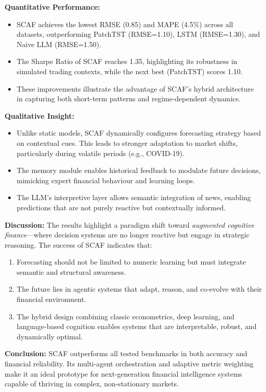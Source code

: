 \documentclass[conference]{IEEEtran}
\begin{document}
\textbf{Quantitative Performance:}
\begin{itemize}
    \item SCAF achieves the lowest RMSE (0.85) and MAPE (4.5\%) across all datasets, outperforming PatchTST (RMSE=1.10), LSTM (RMSE=1.30), and Naive LLM (RMSE=1.50).
    \item The Sharpe Ratio of SCAF reaches 1.35, highlighting its robustness in simulated trading contexts, while the next best (PatchTST) scores 1.10.
    \item These improvements illustrate the advantage of SCAF's hybrid architecture in capturing both short-term patterns and regime-dependent dynamics.
\end{itemize}

\textbf{Qualitative Insight:}
\begin{itemize}
    \item Unlike static models, SCAF dynamically configures forecasting strategy based on contextual cues. This leads to stronger adaptation to market shifts, particularly during volatile periods (e.g., COVID-19).
    \item The memory module enables historical feedback to modulate future decisions, mimicking expert financial behaviour and learning loops.
    \item The LLM’s interpretive layer allows semantic integration of news, enabling predictions that are not purely reactive but contextually informed.
\end{itemize}

\textbf{Discussion:}
The results highlight a paradigm shift toward \emph{augmented cognitive finance}—where decision systems are no longer reactive but engage in strategic reasoning. The success of SCAF indicates that:
\begin{enumerate}
    \item Forecasting should not be limited to numeric learning but must integrate semantic and structural awareness.
    \item The future lies in agentic systems that adapt, reason, and co-evolve with their financial environment.
    \item The hybrid design combining classic econometrics, deep learning, and language-based cognition enables systems that are interpretable, robust, and dynamically optimal.
\end{enumerate}

\textbf{Conclusion:}
SCAF outperforms all tested benchmarks in both accuracy and financial reliability. Its multi-agent orchestration and adaptive metric weighting make it an ideal prototype for next-generation financial intelligence systems capable of thriving in complex, non-stationary markets.
\end{document}

